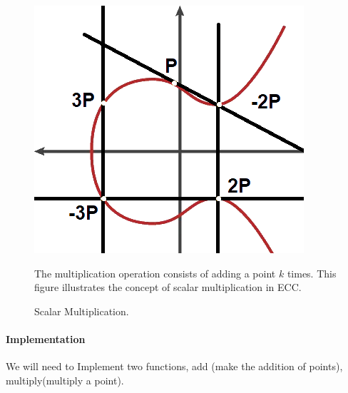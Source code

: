\begin{figure}[H]
\begin{minipage}{0.5\textwidth}
  \centering
  \includegraphics[width=\linewidth]{images/mult.png}
  \caption{Scalar Multiplication.}
  \label{fig:Scalar Multiplication}
\end{minipage}%
\begin{minipage}{0.5\textwidth}
The multiplication operation consists of adding a point $k$ times. This figure illustrates the concept of scalar multiplication in ECC.
\end{minipage}
\end{figure}

\paragraph{Implementation}
We will need to Implement two functions, add (make the addition of points), multiply(multiply a point).

